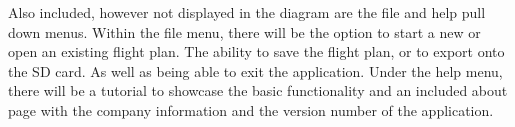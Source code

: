 \documentclass[12pt, letterpaper]{article}
\begin{document}
Also included, however not displayed in the diagram are the file and help pull down menus. Within the file menu, there will be the option to start a new or open an existing flight plan. The ability to save the flight plan, or to export onto the SD card. As well as being able to exit the application. Under the help menu, there will be a tutorial to showcase the basic functionality and an included about page with the company information and the version number of the application.

\newpage
\appendix

{}

\end{document}
